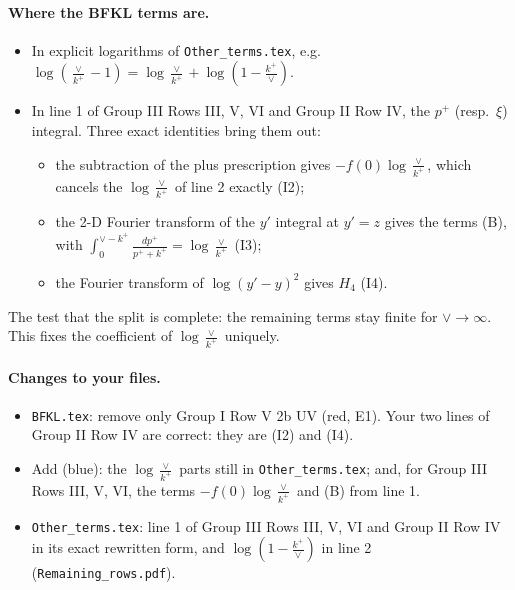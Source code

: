 \documentclass[10pt]{article}
\numberwithin{equation}{section}
\newcommand{\new}[1]{{\color{blue}#1}}
\newcommand{\old}[1]{{\color{red}#1}}
\begin{document}
\paragraph{Where the BFKL terms are.}
\begin{itemize}
\item In explicit logarithms of \texttt{Other\_terms.tex}, e.g.\ $\log(\frac{\vee}{k^+}-1)=\log\frac{\vee}{k^+}+\log(1-\frac{k^+}{\vee})$.
\item In line 1 of Group III Rows III, V, VI and Group II Row IV, the $p^+$ (resp.\ $\xi$) integral. Three exact identities bring them out:
\begin{itemize}
\item the subtraction of the plus prescription gives $-f(0)\log\frac{\vee}{k^+}$, which cancels the $\log\frac{\vee}{k^+}$ of line 2 exactly (I2);
\item the 2-D Fourier transform of the $y'$ integral at $y'=z$ gives the terms (B), with $\int_0^{\vee-k^+}\frac{dp^+}{p^++k^+}=\log\frac{\vee}{k^+}$ (I3);
\item the Fourier transform of $\log(y'-y)^2$ gives $H_4$ (I4).
\end{itemize}
\end{itemize}
The test that the split is complete: the remaining terms stay finite for $\vee\to\infty$. This fixes the coefficient of $\log\frac{\vee}{k^+}$ uniquely.

\paragraph{Changes to your files.}
\begin{itemize}
\item \texttt{BFKL.tex}: remove only Group I Row V 2b UV (\old{red}, E1). Your two lines of Group II Row IV are correct: they are (I2) and (I4).
\item Add (\new{blue}): the $\log\frac{\vee}{k^+}$ parts still in \texttt{Other\_terms.tex}; and, for Group III Rows III, V, VI, the terms $-f(0)\log\frac{\vee}{k^+}$ and (B) from line 1.
\item \texttt{Other\_terms.tex}: line 1 of Group III Rows III, V, VI and Group II Row IV in its exact rewritten form, and $\log(1-\frac{k^+}{\vee})$ in line 2 (\texttt{Remaining\_rows.pdf}).
\end{itemize}
\end{document}
